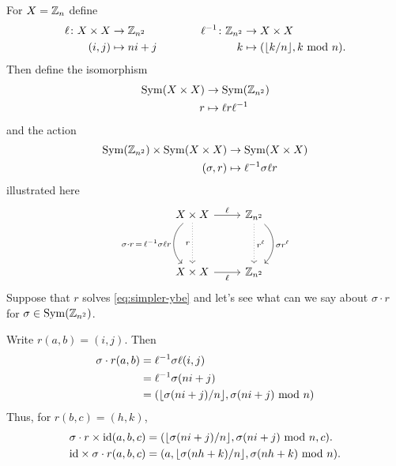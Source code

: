 \begin{xmpl}
    For $X=\mathbb{Z}_n$ define
    $$
    \begin{matrix}
        \begin{aligned}
            \ell\colon X\times X&\to\mathbb{Z}_{n^2}\\
            (i,j)&\mapsto ni+j
        \end{aligned}
        &
        \qquad
        &
        \begin{aligned}
            \ell^{-1}\colon\mathbb{Z}_{n^2}&\to X\times X\\
            k&\mapsto (\lfloor k/n\rfloor,k\,\operatorname{mod}\,n).
        \end{aligned}
    \end{matrix}
    $$
    Then define the isomorphism
    \begin{align*}
        {\rm Sym}(X\times X)&\to{\rm Sym}(\mathbb{Z}_{n^2})\\
        r&\mapsto\ell r\ell^{-1}
    \end{align*}
    and the action
    \begin{align*}
        {\rm Sym}(\mathbb{Z}_{n^2})\times{\rm Sym}(X\times X)&\to{\rm Sym}(X\times X)\\
            (\sigma,r)&\mapsto\ell^{-1}\sigma\ell r
    \end{align*}
    illustrated here
    $$
        \begin{tikzcd}[row sep=huge]
        X\times X
                \arrow[r,"\ell"]
                \arrow[d,"r"',dotted]
                \arrow[d,
                "\sigma\cdot r\,=\,\ell^{-1}\sigma\ell r"',
                    bend right=49]
            &\Z_{n^2}
                \arrow[d,bend left=49,"\sigma r^\ell"]
                \arrow[d,dotted,"r^\ell"]\\
        X\times X
                \arrow[r,"\ell"']
            &\Z_{n^2}
        \end{tikzcd}
    $$
    Suppose that $r$ solves \eqref{eq:simpler-ybe} and let's see what can we say about $\sigma\cdot r$ for $\sigma\in{\rm Sym}(\mathbb{Z}_{n^2})$.

    Write $r(a,b)=(i,j)$. Then
    \begin{align*}
        \sigma\cdot r(a,b) &= \ell^{-1}\sigma\ell(i,j)\\
            &= \ell^{-1}\sigma(ni+j)\\
            &= (\lfloor\sigma(ni+j)/n\rfloor,\sigma(ni+j)\,\operatorname{mod}\,n)
    \end{align*}
    Thus, for $r(b,c)=(h,k)$,
    \begin{align*}
        \sigma\cdot r\times\operatorname{id}(a,b,c)
            &= (\lfloor\sigma(ni+j)/n\rfloor
                ,\sigma(ni+j)\,\operatorname{mod}\,n
                ,c).\\
        {\operatorname{id}}\times\sigma\cdot r(a,b,c)
            &=(a
                ,\lfloor\sigma(nh+k)/n\rfloor
                ,\sigma(nh+k)\,\operatorname{mod}\,n).
    \end{align*}
\end{xmpl}

